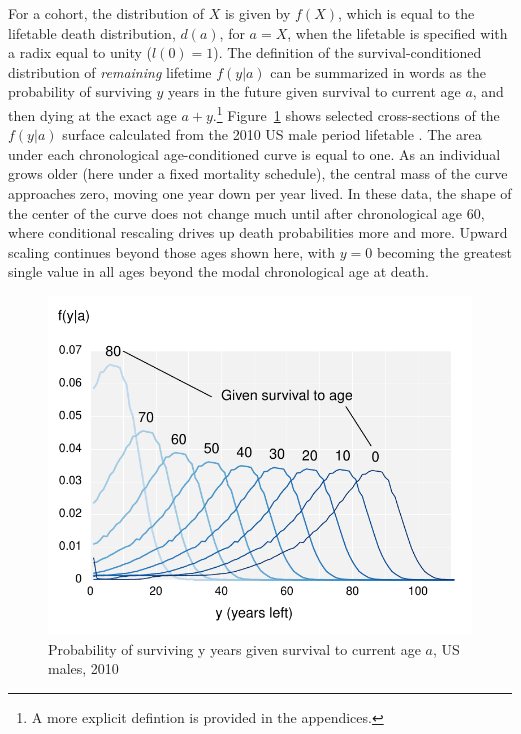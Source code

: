 \documentclass{article}
\begin{document}
For a cohort, the distribution of $X$ is given by $f(X)$, which is equal to the
lifetable death distribution, $d(a)$, for $a = X$, when the lifetable is
specified with a radix equal to unity ($l(0)=1$).
The definition of the survival-conditioned distribution of \textit{remaining}
lifetime $f(y|a)$ can be summarized in words as the probability of surviving $y$
years in the future given survival to current age $a$, and then dying at the
exact age $a+y$.\footnote{A more explicit defintion is provided in the
appendices.} Figure~\ref{fig:fya} shows selected cross-sections of the $f(y|a)$
surface calculated from the 2010 US male period lifetable . The area under each chronological age-conditioned curve is equal to one.
As an individual grows older (here under a fixed mortality schedule), the
central mass of the curve approaches zero, moving one year down per year lived.
In these data, the shape of the center of the curve does not change much until
after chronological age 60, where conditional rescaling drives up death probabilities more and more. Upward
scaling continues beyond those ages shown here, with $y=0$ becoming the greatest
single value in all ages beyond the modal chronological age at death.

 \begin{figure}[h]
\centering
	\caption{Probability of surviving y years given survival to current age $a$, US
	males, 2010}
	\label{fig:fya}
	\includegraphics[scale=.8]{Figures/fya.pdf}	
\end{figure}
\end{document}
